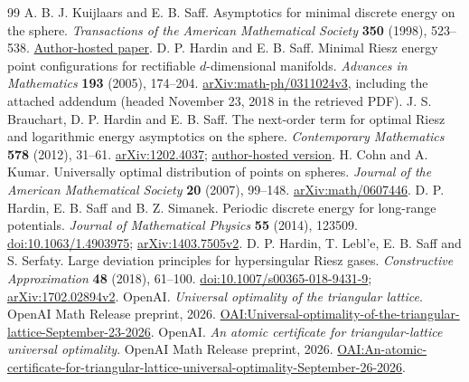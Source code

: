 \documentclass[11pt]{article}
\begin{document}
\begin{thebibliography}{99}
A. B. J. Kuijlaars and E. B. Saff.
Asymptotics for minimal discrete energy on the sphere.
\emph{Transactions of the American Mathematical Society} \textbf{350} (1998),
523--538. \href{https://www.math.vanderbilt.edu/saffeb/texts/159.pdf}{Author-hosted paper}.
D. P. Hardin and E. B. Saff.
Minimal Riesz energy point configurations for rectifiable $d$-dimensional
manifolds. \emph{Advances in Mathematics} \textbf{193} (2005), 174--204.
\href{https://arxiv.org/abs/math-ph/0311024}{arXiv:math-ph/0311024v3},
including the attached addendum (headed November 23, 2018 in the retrieved PDF).
J. S. Brauchart, D. P. Hardin and E. B. Saff.
The next-order term for optimal Riesz and logarithmic energy asymptotics
on the sphere. \emph{Contemporary Mathematics} \textbf{578} (2012), 31--61.
\href{https://arxiv.org/abs/1202.4037}{arXiv:1202.4037};
\href{https://www.math.vanderbilt.edu/saffeb/texts/235.pdf}{author-hosted version}.
H. Cohn and A. Kumar.
Universally optimal distribution of points on spheres.
\emph{Journal of the American Mathematical Society} \textbf{20} (2007), 99--148.
\href{https://arxiv.org/abs/math/0607446}{arXiv:math/0607446}.
D. P. Hardin, E. B. Saff and B. Z. Simanek.
Periodic discrete energy for long-range potentials.
\emph{Journal of Mathematical Physics} \textbf{55} (2014), 123509.
\href{https://doi.org/10.1063/1.4903975}{doi:10.1063/1.4903975};
\href{https://arxiv.org/abs/1403.7505v2}{arXiv:1403.7505v2}.
D. P. Hardin, T. Lebl'e, E. B. Saff and S. Serfaty.
Large deviation principles for hypersingular Riesz gases.
\emph{Constructive Approximation} \textbf{48} (2018), 61--100.
\href{https://doi.org/10.1007/s00365-018-9431-9}{doi:10.1007/s00365-018-9431-9};
\href{https://arxiv.org/abs/1702.02894v2}{arXiv:1702.02894v2}.
OpenAI. \emph{Universal optimality of the triangular lattice}.
OpenAI Math Release preprint, 2026.
\href{https://github.com/openai/math/blob/adc7f1241b42e322a6451854ab7e4b4c146bf78a/preprints/Universal-optimality-of-the-triangular-lattice-September-23-2026/paper.pdf}{OAI:Universal-optimality-of-the-triangular-lattice-September-23-2026}.
OpenAI. \emph{An atomic certificate for triangular-lattice universal optimality}.
OpenAI Math Release preprint, 2026.
\href{https://github.com/openai/math/blob/adc7f1241b42e322a6451854ab7e4b4c146bf78a/preprints/An-atomic-certificate-for-triangular-lattice-universal-optimality-September-26-2026/paper.pdf}{OAI:An-atomic-certificate-for-triangular-lattice-universal-optimality-September-26-2026}.
\end{thebibliography}
\end{document}
